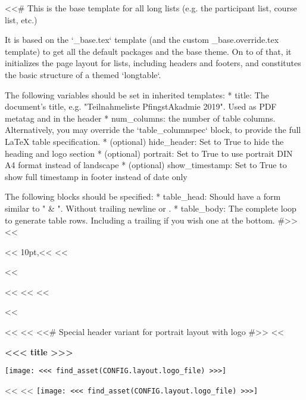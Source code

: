 <<# This is the base template for all long lists (e.g. the participant list, course list, etc.)

    It is based on the `_base.tex` template (and the custom _base.override.tex template) to get all the default packages
    and the base theme. On to of that, it initializes the page layout for lists, including headers and footers, and
    constitutes the basic structure of a themed `longtable`.

    The following variables should be set in inherited templates:
      * title: The document's title, e.g. "Teilnahmeliste PfingstAkadmie 2019". Used as PDF metatag and in the header
      * num_columns: the number of table columns. Alternatively, you may override the `table_columnspec` block, to
        provide the full LaTeX table specification.
      * (optional) hide_header: Set to True to hide the heading and logo section
      * (optional) portrait: Set to True to use portrait DIN A4 format instead of landscape
      * (optional) show_timestamp: Set to True to show full timestamp in footer instead of date only

    The following blocks should be specified:
      * table_head: Should have a form similar to " & ". Without trailing newline
        or \hline.
      * table_body: The complete loop to generate table rows. Including a trailing \hline if you wish one at the bottom.
#>>
<<%


<<%
    10pt,<<%
<<%


<<%
    \geometry{left=1cm,right=1cm}

    \cfoot[]{}
    <<%
    <<%
    <<%

    \newcommand{\head}[1]{\textcolor{white}{\textbf{#1}}}
<<%

<<%
    <<%
        \thispagestyle{plain}
        <<# Special header variant for portrait layout with logo #>>
        <<%
            \begin{minipage}[c]{\textwidth-3cm}%
                \headingfamily\bfseries\huge{}<<< title >>>
            \end{minipage}%
            \begin{minipage}[c]{3cm}%
                \texttt{[image: <<< find\_asset(CONFIG.layout.logo\_file) >>>]}
            \end{minipage}
        <<%
            <<%
                \hspace*{\fill}\texttt{[image: <<< find\_asset(CONFIG.layout.logo\_file) >>>]}\\

